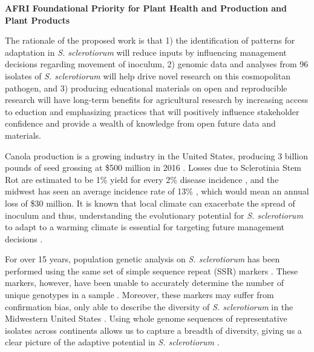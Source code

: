 \documentclass[12pt,letterpaper]{article}
\begin{document}

\noindent
\textbf{AFRI Foundational Priority for Plant Health and Production and Plant Products}

The rationale of the proposed work is that 1) the identification of patterns for adaptation in \textit{S. sclerotiorum} will reduce inputs by influencing management decisions regarding movement of inoculum, 2) genomic data and analyses from 96 isolates of \textit{S. sclerotiorum} will help drive novel research on this cosmopolitan pathogen, and 3) producing educational materials on open and reproducible research will have long-term benefits for agricultural research by increasing access to eduction and emphasizing practices that will positively influence stakeholder confidence and provide a wealth of knowledge from open future data and materials. 

Canola production is a growing industry in the United States, producing 3 billion pounds of seed grossing at \$500 million in 2016 \citep{usda2017production, usda2017values}. Losses due to Sclerotinia Stem Rot are estimated to be 1\% yield for every 2\% disease incidence \citep{delrio2007impact}, and the midwest has seen an average incidence rate of 13\% \citep{markell2009sclerotinia}, which would mean an annual loss of \$30 million. 
It is known that local climate can exacerbate the spread of inoculum and thus, understanding the evolutionary potential for \textit{S. sclerotiorum} to adapt to a warming climate is essential for targeting future management decisions \citep{attanayake2014inferring,shea2000integrated,billiard2012sex}.

For over 15 years, population genetic analysis on \textit{S. sclerotiorum} has been performed using the same set of simple sequence repeat (SSR) markers \citep{sirjusingh2001characterization}. 
These markers, however, have been unable to accurately determine the number of unique genotypes in a sample \citep{lehner2017independently, lehner2017sclerotinia,arnaud2007standardizing}.
Moreover, these markers may suffer from confirmation bias, only able to describe the diversity of \textit{S. sclerotiorum} in the Midwestern United States \citep{attanayake2013sclerotinia}. 
Using whole genome sequences of representative isolates across continents allows us to capture a breadth of diversity, giving us a clear picture of the adaptive potential in \textit{S. sclerotiorum} \citep{grunwald2016population}.
\end{document}
